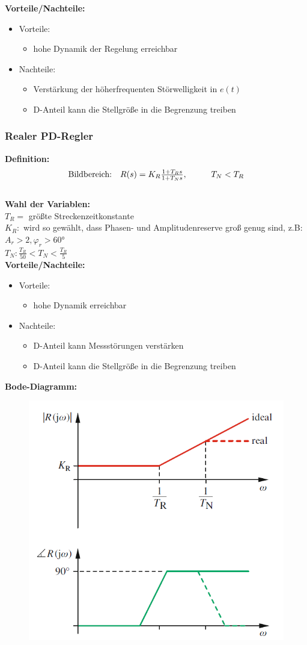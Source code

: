 \documentclass[10pt,a4paper]{article}
\newcommand{\tab}[1][1]{\hspace*{#1cm}}
\begin{document}
\textbf{Vorteile/Nachteile:}
\begin{itemize}
	\item Vorteile:
	\begin{itemize}
		\item hohe Dynamik der Regelung erreichbar
	\end{itemize}
	\item Nachteile:
	\begin{itemize}
		\item Verstärkung der höherfrequenten Störwelligkeit in $e(t)$
		\item D-Anteil kann die Stellgröße in die Begrenzung treiben
	\end{itemize}
\end{itemize}


\subsubsection{Realer PD-Regler}
\textbf{Definition:}
$$
	\begin{array}{ll}
	\text{Bildbereich:} & R(s) = K_R \frac{1 + T_R s}{1 + T_N s}, \tab T_N < T_R
	\end{array}
$$ \\

\textbf{Wahl der Variablen:} \\
$T_R=$ größte Streckenzeitkonstante  \\
$K_R:$ wird so gewählt, dass Phasen- und Amplitudenreserve groß genug sind, z.B: $A_r > 2, \varphi_r > 60°$ \\
$T_N: \frac{T_R}{50} < T_N < \frac{T_R}{5}$ \\

\textbf{Vorteile/Nachteile:}
\begin{itemize}
	\item Vorteile:
	\begin{itemize}
		\item hohe Dynamik erreichbar
	\end{itemize}
	\item Nachteile:
	\begin{itemize}
		\item D-Anteil kann Messstörungen verstärken
		\item D-Anteil kann die Stellgröße in die Begrenzung treiben
	\end{itemize}
\end{itemize}

\textbf{Bode-Diagramm:}
\begin{figure}[H]
	\includegraphics[width = 0.4\columnwidth]{imgs/pd-regler.png}
\end{figure}
\end{document}
